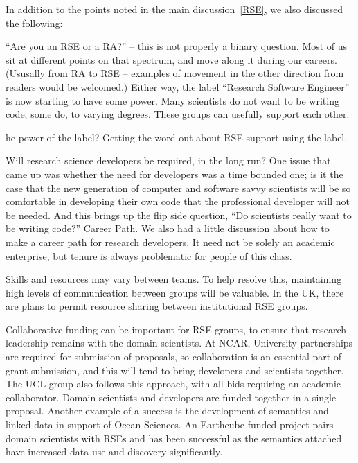 In addition to the points noted in the main discussion~\ref{RSE}, we also
discussed the following:

``Are you an RSE or a RA?'' -- this is not properly a binary question. Most of
us sit at different points on that spectrum, and move along it during our
careers. (Ususally from RA to RSE -- examples of movement in the other direction
from readers would be welcomed.)
Either way, the label ``Research Software Engineer'' is now starting to
have some power. Many scientists do not want to be writing code; some do, to
varying degrees. These groups can usefully support each other.


he power of the label? Getting the word out about RSE support using the label.


Will research science developers be required, in the long run?
One issue that came up was whether the need for developers was a time bounded one; is it the case that the new generation of computer and software savvy scientists will be so comfortable in developing their own code that the professional developer will not be needed.  And this brings up the flip side question, “Do scientists really want to be writing code?”
Career Path.
We also had a little discussion about how to make a career path for research developers. It need not be solely an academic enterprise, but tenure is always problematic for people of this class.

Skills and resources may vary between teams. To help resolve this, maintaining
high levels of communication between groups will be valuable. In the UK, there
are plans to permit resource sharing between institutional RSE groups.

Collaborative funding can be important for RSE groups, to ensure that research
leadership remains with the domain scientists. At NCAR, University partnerships
are required for submission of proposals, so collaboration is an essential part
of grant submission, and this will tend to bring developers and
scientists together. The UCL group also follows this approach, with all bids
requiring an academic collaborator.
Domain scientists and developers are funded together in a single proposal.
Another example of a success is the development of semantics and linked data in
support of Ocean Sciences. An Earthcube funded project pairs domain scientists
with RSEs and has been successful as the semantics attached have increased data
use and discovery significantly.

